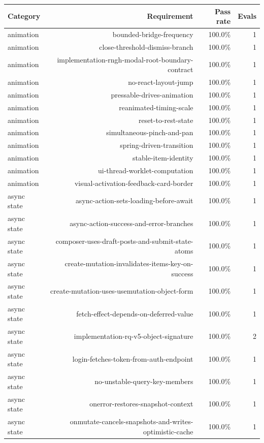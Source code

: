 \begin{table}[htbp]
\centering
\begin{tabular}{lrrr}
\toprule
Category & Requirement & Pass rate & Evals \\
\midrule
animation & bounded-bridge-frequency & 100.0\% & 1 \\
animation & close-threshold-dismiss-branch & 100.0\% & 1 \\
animation & implementation-rngh-modal-root-boundary-contract & 100.0\% & 1 \\
animation & no-react-layout-jump & 100.0\% & 1 \\
animation & pressable-drives-animation & 100.0\% & 1 \\
animation & reanimated-timing-scale & 100.0\% & 1 \\
animation & reset-to-rest-state & 100.0\% & 1 \\
animation & simultaneous-pinch-and-pan & 100.0\% & 1 \\
animation & spring-driven-transition & 100.0\% & 1 \\
animation & stable-item-identity & 100.0\% & 1 \\
animation & ui-thread-worklet-computation & 100.0\% & 1 \\
animation & visual-activation-feedback-card-border & 100.0\% & 1 \\
async state & async-action-sets-loading-before-await & 100.0\% & 1 \\
async state & async-action-success-and-error-branches & 100.0\% & 1 \\
async state & composer-uses-draft-posts-and-submit-state-atoms & 100.0\% & 1 \\
async state & create-mutation-invalidates-items-key-on-success & 100.0\% & 1 \\
async state & create-mutation-uses-usemutation-object-form & 100.0\% & 1 \\
async state & fetch-effect-depends-on-deferred-value & 100.0\% & 1 \\
async state & implementation-rq-v5-object-signature & 100.0\% & 2 \\
async state & login-fetches-token-from-auth-endpoint & 100.0\% & 1 \\
async state & no-unstable-query-key-members & 100.0\% & 1 \\
async state & onerror-restores-snapshot-context & 100.0\% & 1 \\
async state & onmutate-cancels-snapshots-and-writes-optimistic-cache & 100.0\% & 1 \\

\end{tabular}
\end{table}
